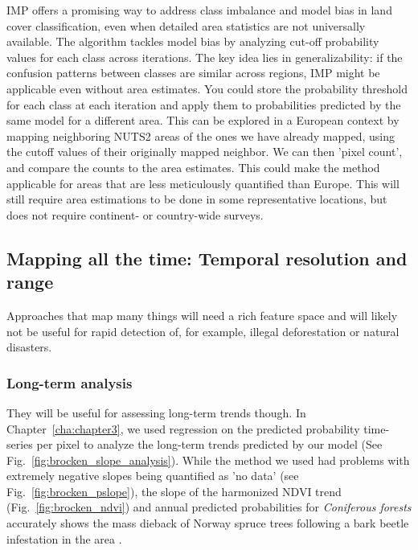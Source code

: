         IMP offers a promising way to address class imbalance and model bias in land cover classification, even when detailed area statistics are not universally available. The algorithm tackles model bias by analyzing cut-off probability values for each class across iterations. The key idea lies in generalizability: if the confusion patterns between classes are similar across regions, IMP might be applicable even without area estimates. You could store the probability threshold for each class at each iteration and apply them to probabilities predicted by the same model for a different area. This can be explored in a European context by mapping neighboring NUTS2 areas of the ones we have already mapped, using the cutoff values of their originally mapped neighbor. We can then 'pixel count', and compare the counts to the area estimates. This could make the method applicable for areas that are less meticulously quantified than Europe. This will still require area estimations to be done in some representative locations, but does not require continent- or country-wide surveys. 
        
    \subsection{Mapping all the time: Temporal resolution and range}
        \label{syn:allthetime}

        Approaches that map many things will need a rich feature space and will likely not be useful for rapid detection of, for example, illegal deforestation or natural disasters. 

        \subsubsection{Long-term analysis}
        They will be useful for assessing long-term trends though. In Chapter\@~\ref{cha:chapter3}, we used regression on the predicted probability time-series per pixel to analyze the long-term trends predicted by our model (See Fig.\@~\ref{fig:brocken_slope_analysis}). While the method we used had problems with extremely negative slopes being quantified as 'no data' (see Fig.\@~\ref{fig:brocken_pslope}), the slope of the harmonized NDVI trend (Fig.\@~\ref{fig:brocken_ndvi}) and annual predicted probabilities for \textit{Coniferous forests} accurately shows the mass dieback of Norway spruce trees following a bark beetle infestation in the area \citep{meyer2017matter}.

